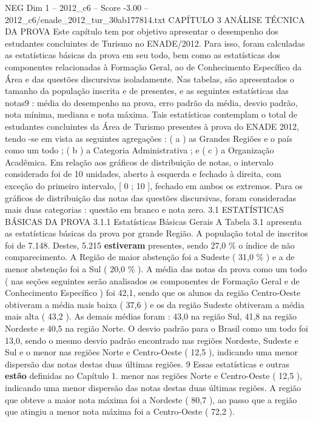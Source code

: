 \begin{textsample}{NEG Dim 1 – 2012\_c6 – Score -3.00 – 2012\_c6/enade\_2012\_tur\_30ab177814.txt}  \label{ex:f1_neg_252}
CAPÍTULO 3 ANÁLISE TÉCNICA DA PROVA Este capítulo tem por objetivo apresentar o desempenho dos estudantes concluintes de Turismo no ENADE/2012.
Para isso, foram calculadas as estatísticas básicas da prova em seu todo, bem como as estatísticas dos componentes relacionadas à Formação Geral, ao de Conhecimento Específico da Área e das questões discursivas isoladamente.
Nas tabelas, são apresentados o tamanho da população inscrita e de presentes, e as seguintes estatísticas das notas9 : média do desempenho na prova, erro padrão da média, desvio padrão, nota mínima, mediana e nota máxima.
Tais estatísticas contemplam o total de estudantes concluintes da Área de Turismo presentes à prova do ENADE 2012, tendo -se em vista as seguintes agregações : ( a ) as Grandes Regiões e o país como um todo ; ( b ) a Categoria Administrativa ; e ( c ) a Organização Acadêmica.
Em relação aos gráficos de distribuição de notas, o intervalo considerado foi de 10 unidades, aberto à esquerda e fechado à direita, com exceção do primeiro intervalo, [ 0 ; 10 ], fechado em ambos os extremos.
Para os gráficos de distribuição das notas das questões discursivas, foram consideradas mais duas categorias : questão em branco e nota zero. 3.1 ESTATÍSTICAS BÁSICAS DA PROVA 3.1.1 Estatísticas Básicas Gerais A Tabela 3.1 apresenta as estatísticas básicas da prova por grande Região.
A população total de inscritos foi de 7.148.
Destes, 5.215 \textbf{estiveram} presentes, sendo 27,0 \% o índice de não comparecimento.
A Região de maior abstenção foi a Sudeste ( 31,0 \% ) e a de menor abstenção foi a Sul ( 20,0 \% ).
A média das notas da prova como um todo ( nas seções seguintes serão analisados os componentes de Formação Geral e de Conhecimento Específico ) foi 42,1, sendo que os alunos da região Centro-Oeste obtiveram a média mais baixa ( 37,6 ) e os da região Sudeste obtiveram a média mais alta ( 43,2 ).
As demais médias foram : 43,0 na região Sul, 41,8 na região Nordeste e 40,5 na região Norte.
O desvio padrão para o Brasil como um todo foi 13,0, sendo o mesmo desvio padrão encontrado nas regiões Nordeste, Sudeste e Sul e o menor nas regiões Norte e Centro-Oeste ( 12,5 ), indicando uma menor dispersão das notas destas duas últimas regiões. 9 Essas estatísticas e outras \textbf{estão} definidas no Capítulo 1. menor nas regiões Norte e Centro-Oeste ( 12,5 ), indicando uma menor dispersão das notas destas duas últimas regiões.
A região que obteve a maior nota máxima foi a Nordeste ( 80,7 ), ao passo que a região que atingiu a menor nota máxima foi a Centro-Oeste ( 72,2 ).

\end{textsample}

